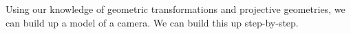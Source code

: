 Using our knowledge of geometric transformations and projective geometries, we can build up a model of a camera. We can build this up step-by-step.


